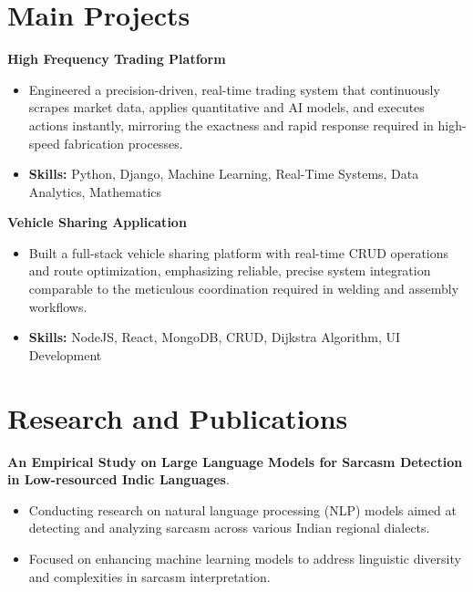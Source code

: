 \documentclass[a4paper,11pt]{article}
\begin{document}
\section{\textbf{Main Projects}}

\vspace{1mm}
  \textbf{High Frequency Trading Platform  }
\vspace{-1.5mm} %
\begin{itemize}
  \item Engineered a precision-driven, real-time trading system that continuously scrapes market data, applies quantitative and AI models, and executes actions instantly, mirroring the exactness and rapid response required in high-speed fabrication processes.
\vspace{-3mm}
  \item \textbf{Skills:} Python, Django, Machine Learning, Real-Time Systems, Data Analytics, Mathematics
\end{itemize}


\vspace{1mm}
   \textbf{Vehicle Sharing Application }
\vspace{-1.5mm} %
\begin{itemize}
  \item Built a full-stack vehicle sharing platform with real-time CRUD operations and route optimization, emphasizing reliable, precise system integration comparable to the meticulous coordination required in welding and assembly workflows.
\vspace{-3mm}
  \item \textbf{Skills:} NodeJS, React, MongoDB, CRUD, Dijkstra Algorithm, UI Development
\end{itemize}



\section{\textbf{Research and Publications} \hfill }
\vspace{1mm}
  \textbf{An Empirical Study on Large Language Models for Sarcasm Detection in Low-resourced Indic Languages}.
\vspace{-1mm} %
\begin{itemize}
  \item Conducting research on natural language processing (NLP) models aimed at detecting and analyzing sarcasm across various Indian regional dialects.
\vspace{-3mm}
  \item Focused on enhancing machine learning models to address linguistic diversity and complexities in sarcasm interpretation.
\end{itemize}
\end{document}
